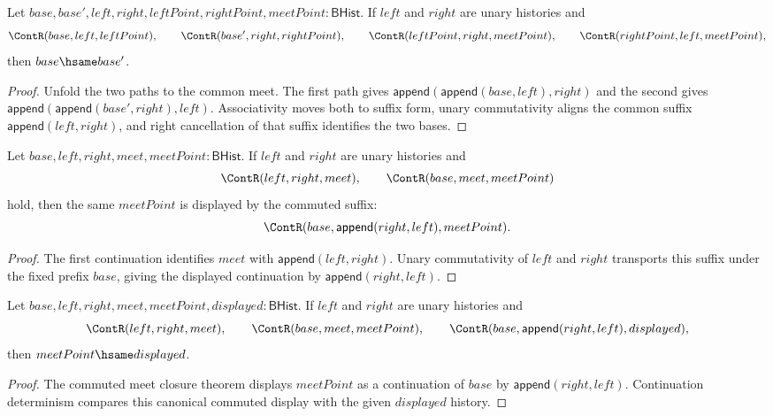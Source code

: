 \begin{theorem}
\label{thm:filter-principal-suffix-unary-commuting-square-base-deterministic}
Let $base,base',left,right,leftPoint,rightPoint,meetPoint:\mathsf{BHist}$.
If $left$ and $right$ are unary histories and
$$
\ContR(base,left,leftPoint),\qquad
\ContR(base',right,rightPoint),\qquad
\ContR(leftPoint,right,meetPoint),\qquad
\ContR(rightPoint,left,meetPoint),
$$
then $base\hsame base'$.
\end{theorem}
\begin{proof}
Unfold the two paths to the common meet. The first path gives
$\mathsf{append}(\mathsf{append}(base,left),right)$ and the second gives
$\mathsf{append}(\mathsf{append}(base',right),left)$. Associativity moves both
to suffix form, unary commutativity aligns the common suffix
$\mathsf{append}(left,right)$, and right cancellation of that suffix identifies
the two bases.
\end{proof}

\begin{theorem}
\label{thm:filter-principal-suffix-commuted-meet-closed}
Let $base,left,right,meet,meetPoint:\mathsf{BHist}$. If $left$ and $right$
are unary histories and
$$
\ContR(left,right,meet),\qquad
\ContR(base,meet,meetPoint)
$$
hold, then the same $meetPoint$ is displayed by the commuted suffix:
$$
\ContR(base,\mathsf{append}(right,left),meetPoint).
$$
\end{theorem}
\begin{proof}
The first continuation identifies $meet$ with $\mathsf{append}(left,right)$.
Unary commutativity of $left$ and $right$ transports this suffix under the
fixed prefix $base$, giving the displayed continuation by
$\mathsf{append}(right,left)$.
\end{proof}

\begin{theorem}
\label{thm:filter-principal-suffix-unary-intersection-commuted-result-deterministic}
Let $base,left,right,meet,meetPoint,displayed:\mathsf{BHist}$. If $left$ and
$right$ are unary histories and
$$
\ContR(left,right,meet),\qquad
\ContR(base,meet,meetPoint),\qquad
\ContR(base,\mathsf{append}(right,left),displayed),
$$
then $meetPoint\hsame displayed$.
\end{theorem}
\begin{proof}
The commuted meet closure theorem displays $meetPoint$ as a continuation of
$base$ by $\mathsf{append}(right,left)$. Continuation determinism compares this
canonical commuted display with the given $displayed$ history.
\end{proof}

